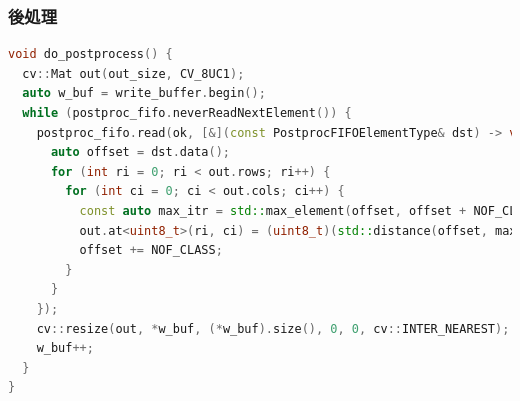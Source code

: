 \subsubsection{後処理}

\setcounter{lstnumber}{1}
\begin{lstlisting}[language=c++,firstnumber=last,caption=do\_postprocess(),label=code:postproc,float,floatplacement=H]
void do_postprocess() {
  cv::Mat out(out_size, CV_8UC1);
  auto w_buf = write_buffer.begin();
  while (postproc_fifo.neverReadNextElement()) {
    postproc_fifo.read(ok, [&](const PostprocFIFOElementType& dst) -> void {
      auto offset = dst.data();
      for (int ri = 0; ri < out.rows; ri++) {
        for (int ci = 0; ci < out.cols; ci++) {
          const auto max_itr = std::max_element(offset, offset + NOF_CLASS);
          out.at<uint8_t>(ri, ci) = (uint8_t)(std::distance(offset, max_itr));
          offset += NOF_CLASS;
        }
      }
    });
    cv::resize(out, *w_buf, (*w_buf).size(), 0, 0, cv::INTER_NEAREST);
    w_buf++;
  }
}
\end{lstlisting}
